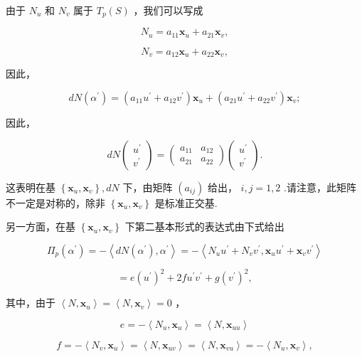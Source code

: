 由于 \({N}_{u}\) 和 \({N}_{v}\) 属于 \({T}_{p}\left( S\right)\) ，我们可以写成

\[
{N}_{u} = {a}_{11}{\mathbf{x}}_{u} + {a}_{21}{\mathbf{x}}_{v}, \tag{1}
\]

\[
{N}_{v} = {a}_{12}{\mathbf{x}}_{u} + {a}_{22}{\mathbf{x}}_{v},
\]

因此，

\[
{dN}\left( {\alpha }^{\prime }\right)  = \left( {{a}_{11}{u}^{\prime } + {a}_{12}{v}^{\prime }}\right) {\mathbf{x}}_{u} + \left( {{a}_{21}{u}^{\prime } + {a}_{22}{v}^{\prime }}\right) {\mathbf{x}}_{v};
\]

因此，

\[
{dN}\left( \begin{array}{l} {u}^{\prime } \\  {v}^{\prime } \end{array}\right)  = \left( \begin{array}{ll} {a}_{11} & {a}_{12} \\  {a}_{21} & {a}_{22} \end{array}\right) \left( \begin{array}{l} {u}^{\prime } \\  {v}^{\prime } \end{array}\right) .
\]

这表明在基 \(\left\{  {{\mathbf{x}}_{u},{\mathbf{x}}_{v}}\right\}  ,{dN}\) 下，由矩阵 \(\left( {a}_{ij}\right)\) 给出， \(i,j = 1,2\) .请注意，此矩阵不一定是对称的，除非 \(\left\{  {{\mathbf{x}}_{u},{\mathbf{x}}_{v}}\right\}\) 是标准正交基.

另一方面，在基 \(\left\{  {{\mathbf{x}}_{u},{\mathbf{x}}_{v}}\right\}\) 下第二基本形式的表达式由下式给出

\[
{\Pi }_{p}\left( {\alpha }^{\prime }\right)  =  - \left\langle  {{dN}\left( {\alpha }^{\prime }\right) ,{\alpha }^{\prime }}\right\rangle   =  - \left\langle  {{N}_{u}{u}^{\prime } + {N}_{v}{v}^{\prime },{\mathbf{x}}_{u}{u}^{\prime } + {\mathbf{x}}_{v}{v}^{\prime }}\right\rangle
\]

\[
= e{\left( {u}^{\prime }\right) }^{2} + {2f}{u}^{\prime }{v}^{\prime } + g{\left( {v}^{\prime }\right) }^{2},
\]

其中，由于 \(\left\langle  {N,{\mathbf{x}}_{u}}\right\rangle   = \left\langle  {N,{\mathbf{x}}_{v}}\right\rangle   = 0\) ，

\[
e =  - \left\langle  {{N}_{u},{\mathbf{x}}_{u}}\right\rangle   = \left\langle  {N,{\mathbf{x}}_{uu}}\right\rangle
\]

\[
f =  - \left\langle  {{N}_{v},{\mathbf{x}}_{u}}\right\rangle   = \left\langle  {N,{\mathbf{x}}_{uv}}\right\rangle   = \left\langle  {N,{\mathbf{x}}_{vu}}\right\rangle   =  - \left\langle  {{N}_{u},{\mathbf{x}}_{v}}\right\rangle  ,
\]


